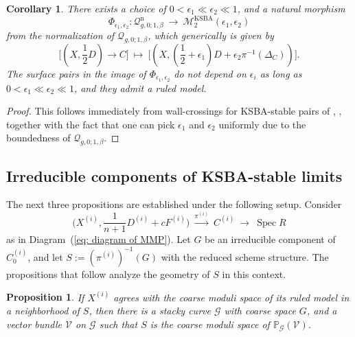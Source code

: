 \documentclass[a4paper,12pt]{amsart}
\newcommand{\cQ}{\mathcal{Q}}
\DeclareMathOperator{\Spec}{Spec}
\DeclareMathOperator{\KSBA}{\mathrm{KSBA}}
\newcommand{\bP}{{\mathbb P}}
\newcommand{\cG}{{\mathcal{G}}}
\newcommand{\cV}{{\mathcal{V}}}
\DeclareMathOperator{\norm}{n}
\newcommand\cM{{\mathcal{M}}}
\newtheorem{corollary}[theorem]{Corollary}
\newtheorem{prop}[theorem]{Proposition}
\theoremstyle{definition}
\theoremstyle{remark}
\begin{document}
\begin{corollary}\label{cor_there_is_a_map_normalization_qmaps_to_ksba} 
There exists a choice of $0<\epsilon_1\ll \epsilon_2\ll 1$, and a natural morphism \[\Phi_{\epsilon_1,\epsilon_2}\colon\cQ_{g,0;1,\beta}^{\norm} \ \longrightarrow \ \cM^{\KSBA}_2(\epsilon_1,\epsilon_2)\] from the normalization of $\cQ_{g,0;1,\beta}$, which generically is given by $$\textstyle \big[(X,\frac{1}{2}D)\to C\big] \ \mapsto \ \big[(X,(\frac{1}{2}+\epsilon_1)D+\epsilon_2 \pi^{-1}(\Delta_C))\big].$$  The surface pairs in the image of $\Phi_{\epsilon_1,\epsilon_2}$ do not depend on $\epsilon_i$ as long as $0<\epsilon_1\ll \epsilon_2\ll 1$, and they admit a ruled model.
\end{corollary}

\begin{proof}
    This follows immediately from wall-crossings for KSBA-stable pairs of \cite{ascher2023wall, meng2023mmp}, , together with the fact that one can pick $\epsilon_1$ and $\epsilon_2$ uniformly due to the boundedness of $\cQ_{g,0;1,\beta}$.
\end{proof}
\subsection{Irreducible components of KSBA-stable limits}\label{subsection_irred_cpt_of_KSBA_limits}


The next three propositions are established under the following setup. Consider  
\[
\textstyle \big(X^{(i)},\frac{1}{n+1}D^{(i)}+cF^{(i)}\big) \ \stackrel{\pi^{(i)}}{\longrightarrow} \ C^{(i)} \ \longrightarrow \ \Spec R
\]
as in Diagram~(\ref{eq: diagram of MMP}). Let \(G\) be an irreducible component of \(C^{(i)}_0\), and let \(S := (\pi^{(i)})^{-1}(G)\) with the reduced scheme structure. The propositions that follow analyze the geometry of \(S\) in this context.



\begin{prop}\label{prop: geometry of S1}
    If $X^{(i)}$ agrees with the coarse moduli space of its ruled model in a neighborhood of $S$, then there is a stacky curve $\cG$ with coarse space $G$, and a vector bundle $\cV$ on $\cG$ such that $S$ is the coarse moduli space of $\bP_{\cG}(\cV)$. 
\end{prop}
\end{document}
